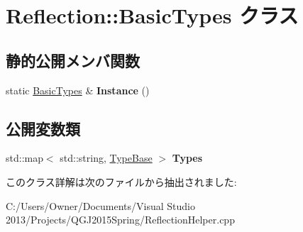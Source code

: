\hypertarget{class_reflection_1_1_basic_types}{}\section{Reflection\+:\+:Basic\+Types クラス}
\label{class_reflection_1_1_basic_types}
\subsection*{静的公開メンバ関数}
\begin{DoxyCompactItemize}
\item 
static \hyperlink{class_reflection_1_1_basic_types}{Basic\+Types} \& {\bfseries Instance} ()\hypertarget{class_reflection_1_1_basic_types_a57792674f13ec517b182d3b857827b01}{}\label{class_reflection_1_1_basic_types_a57792674f13ec517b182d3b857827b01}

\end{DoxyCompactItemize}
\subsection*{公開変数類}
\begin{DoxyCompactItemize}
\item 
std\+::map$<$ std\+::string, \hyperlink{class_reflection_1_1_type_base}{Type\+Base} $>$ {\bfseries Types}\hypertarget{class_reflection_1_1_basic_types_ab37fa73049652b2a11d0d4775e8aadf7}{}\label{class_reflection_1_1_basic_types_ab37fa73049652b2a11d0d4775e8aadf7}

\end{DoxyCompactItemize}


このクラス詳解は次のファイルから抽出されました\+:\begin{DoxyCompactItemize}
\item 
C\+:/\+Users/\+Owner/\+Documents/\+Visual Studio 2013/\+Projects/\+Q\+G\+J2015\+Spring/Reflection\+Helper.\+cpp\end{DoxyCompactItemize}
